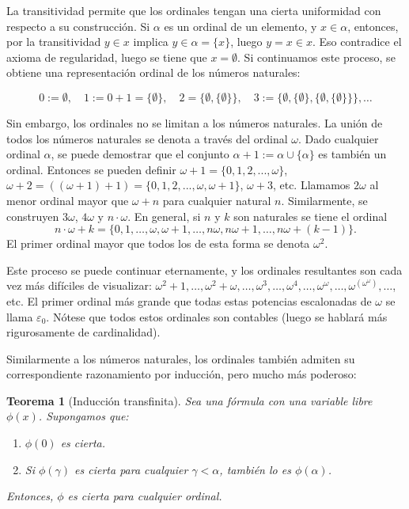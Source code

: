 \documentclass[11pt,a4paper]{book}
\theoremstyle{plain}
\newtheorem{teorema}{Teorema}[chapter]
\theoremstyle{definition}
\theoremstyle{remark}
\begin{document}
La transitividad permite que los ordinales tengan una cierta uniformidad con respecto a su construcción. Si $\alpha$ es un ordinal de un elemento, y $x \in \alpha$, entonces, por la transitividad $y \in x$ implica $y \in \alpha = \{x\}$, luego $y = x \in x$. Eso contradice el axioma de regularidad, luego se tiene que $x = \emptyset$. Si continuamos este proceso, se obtiene una representación ordinal de los números naturales:

\[
0 := \emptyset,\quad 1 := 0 + 1 = \{\emptyset\},\quad 2 = \{\emptyset, \{\emptyset\}\},\quad 3 := \{\emptyset, \{\emptyset\}, \{\emptyset, \{\emptyset\}\}\}, \ldots
 \]

 Sin embargo, los ordinales no se limitan a los números naturales. La unión de todos los números naturales se denota a través del ordinal $\omega$. Dado cualquier ordinal $\alpha$, se puede demostrar que el conjunto $\alpha + 1 := \alpha \cup \{ \alpha \}$ es también un ordinal. Entonces se pueden definir $\omega + 1 = \{ 0, 1, 2, ..., \omega\}$, $\omega + 2 = ((\omega + 1) + 1) = \{ 0, 1, 2, ..., \omega, \omega + 1 \} $, $\omega + 3$, etc. Llamamos $2\omega$ al menor ordinal mayor que $\omega + n$ para cualquier natural $n$. Similarmente, se construyen $3\omega$, $4\omega$ y $n \cdot \omega$. En general, si $n$ y $k$ son naturales se tiene el ordinal
\[
n \cdot \omega + k = \{0,1,\ldots,\omega,\omega+1,\ldots,n\omega,n\omega+1,\ldots,n\omega+(k-1)\}.
\]
El primer ordinal mayor que todos los de esta forma se denota $\omega^2$.

Este proceso se puede continuar eternamente, y los ordinales resultantes son cada vez más difíciles de visualizar: $\omega^2 + 1,\ldots,\omega^2 + \omega,\ldots,\omega^3,\ldots,\omega^4,\ldots,\omega^\omega,\ldots,\omega^{(\omega^\omega)},\ldots$, etc. El primer ordinal más grande que todas estas potencias escalonadas de $\omega$ se llama $\varepsilon_0$. Nótese que todos estos ordinales son contables (luego se hablará más rigurosamente de cardinalidad).

Similarmente a los números naturales, los ordinales también admiten su correspondiente razonamiento por inducción, pero mucho más poderoso:

 \begin{teorema}[Inducción transfinita]
Sea una fórmula con una variable libre $\phi(x)$. Supongamos que:
\begin{enumerate}
    \item $\phi(0)$ es cierta.
    \item Si $\phi(\gamma)$ es cierta para cualquier $\gamma < \alpha$, también lo es $\phi(\alpha)$.
\end{enumerate}
Entonces, $\phi$ es cierta para cualquier ordinal.
\end{teorema}
\end{document}
